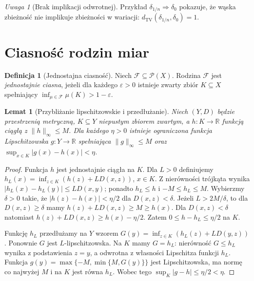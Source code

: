 \documentclass[11pt,a4paper,oneside]{book}
\numberwithin{equation}{chapter}
\theoremstyle{plain}
\newtheorem{lemat}[twierdzenie]{Lemat}
\theoremstyle{definition}
\newtheorem{definicja}[twierdzenie]{Definicja}
\theoremstyle{remark}
\newtheorem{uwaga}[twierdzenie]{Uwaga}
\begin{document}
\begin{uwaga}[Brak implikacji odwrotnej]
Przykład $\delta_{1/n}\Rightarrow\delta_0$ pokazuje,
że wąska zbieżność nie implikuje zbieżności w wariacji:
$d_{\mathrm{TV}}(\delta_{1/n},\delta_0)=1$.
\end{uwaga}

\section{Ciasność rodzin miar}
\begin{definicja}[Jednostajna ciasność]
\label{def:uniform-tight-22}
Niech $\mathcal F\subseteq\mathcal P(X)$.
Rodzina $\mathcal F$ jest \emph{jednostajnie ciasna},
jeżeli dla każdego $\varepsilon>0$ istnieje
zwarty zbiór $K\subseteq X$ spełniający
$\inf_{\mu\in\mathcal F}\mu(K)>1-\varepsilon$.
\end{definicja}

\begin{lemat}[Przybliżanie lipschitzowskie i przedłużanie]
\label{lem:lipschitz-extend-22}
Niech $(Y,D)$ będzie przestrzenią metryczną, $K\subseteq Y$
niepustym zbiorem zwartym, a $h:K\to\mathbb R$ funkcją
ciągłą z $\|h\|_\infty\le M$. Dla każdego $\eta>0$
istnieje ograniczona funkcja Lipschitzowska
$g:Y\to\mathbb R$ spełniająca
$\|g\|_\infty\le M$ oraz
$\sup_{x\in K}|g(x)-h(x)|<\eta$.
\end{lemat}
\begin{proof}
Funkcja $h$ jest jednostajnie ciągła na $K$.
Dla $L>0$ definiujemy
$h_L(x)=\inf_{z\in K}(h(z)+L D(x,z))$, $x\in K$.
Z nierówności trójkąta wynika
$|h_L(x)-h_L(y)|\le L D(x,y)$; ponadto
$h_L\le h$ i $-M\le h_L\le M$.
Wybierzmy $\delta>0$ takie, że
$|h(z)-h(x)|<\eta/2$ dla $D(x,z)<\delta$.
Jeżeli $L>2M/\delta$, to dla $D(x,z)\ge\delta$
mamy $h(z)+LD(x,z)\ge M\ge h(x)$.
Dla $D(x,z)<\delta$ natomiast
$h(z)+LD(x,z)\ge h(x)-\eta/2$.
Zatem $0\le h-h_L\le\eta/2$ na $K$.

Funkcję $h_L$ przedłużamy na $Y$ wzorem
$G(y)=\inf_{z\in K}(h_L(z)+L D(y,z))$.
Ponownie $G$ jest $L$-lipschitzowska. Na $K$
mamy $G=h_L$: nierówność $G\le h_L$ wynika
z podstawienia $z=y$, a odwrotna z własności
Lipschitza funkcji $h_L$. Funkcja
$g(y)=\max\{-M,\min\{M,G(y)\}\}$ jest Lipschitzowska,
ma normę co najwyżej $M$ i na $K$ jest równa $h_L$.
Wobec tego $\sup_K|g-h|\le\eta/2<\eta$.
\end{proof}
\end{document}
